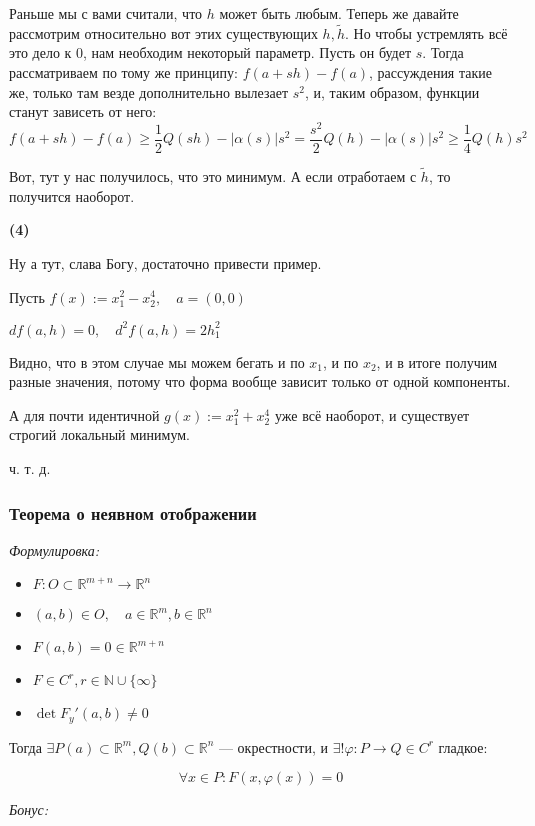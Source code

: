 \documentclass{article}
\begin{document}
Раньше мы с вами считали, что $h$ может быть любым. Теперь же давайте рассмотрим относительно вот этих существующих $h, \widetilde{h}$. Но чтобы устремлять всё это дело к 0, нам необходим некоторый параметр. Пусть он будет $s$.
Тогда рассматриваем по тому же принципу: $f(a + sh) - f(a)$, рассуждения такие же, только там везде дополнительно вылезает $s^2$, и, таким образом, функции станут зависеть от него:
\[f(a + sh) - f(a) \ge \frac{1}{2}Q(sh) - |\alpha(s)|s^2 = \frac{s^2}{2}Q(h) - |\alpha(s)|s^2 \ge \frac{1}{4}Q(h)s^2\]

Вот, тут у нас получилось, что это минимум. А если отработаем с $\widetilde{h}$, то получится наоборот.

\textbf{(4)}

Ну а тут, слава Богу, достаточно привести пример.

Пусть $f(x) := x_1^2-x_2^4, \quad a = (0, 0)$

$df(a, h) = 0, \quad  d^2f(a,h) = 2h_1^2$

Видно, что в этом случае мы можем бегать и по $x_1$, и по $x_2$, и в итоге получим разные значения, потому что форма вообще зависит только от одной компоненты.

А для почти идентичной $g(x) := x_1^2 + x_2^4$ уже всё наоборот, и существует строгий локальный минимум.

ч. т. д. 

\subsubsection{Теорема о неявном отображении}
\textit{Формулировка:}
\begin{itemize}
    \item $F: O \subset \mathbb{R}^{m + n} \rightarrow \mathbb{R}^n$
    \item $(a, b) \in O, \quad a \in \mathbb{R}^m, b \in \mathbb{R}^n$
    \item $F(a, b) = 0 \in \mathbb{R}^{m + n}$
    \item $F \in C^r, r \in \mathbb{N} \cup \{\infty\}$
    \item $\det F_y'(a, b) \neq 0$
\end{itemize}

Тогда $\exists P(a) \subset \mathbb{R}^m, Q(b) \subset \mathbb{R}^n$ --- окрестности, и $\exists !\varphi : P \rightarrow Q \in C^r$ гладкое:

\[\forall x \in P: F(x, \varphi(x)) = 0\]

\textit{Бонус:}
\end{document}
